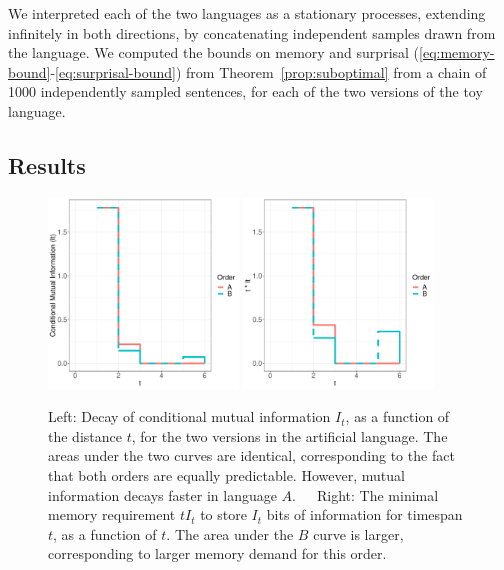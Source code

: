 
We interpreted each of the two languages as a stationary processes, extending infinitely in both directions, by concatenating independent samples drawn from the language.
We computed the bounds on memory and surprisal (\ref{eq:memory-bound}-\ref{eq:surprisal-bound}) from Theorem~\ref{prop:suboptimal} from a chain of 1000 independently sampled sentences, for each of the two versions of the toy language.

\subsection{Results}	

\begin{figure}
\centering
\includegraphics[width=0.45\textwidth]{figures/toy-mis.pdf}
\includegraphics[width=0.45\textwidth]{figures/toy-t-mis.pdf}
%
	\caption{Left: Decay of conditional mutual information $I_t$, as a function of the distance $t$, for the two versions in the artificial language. The areas under the two curves are identical, corresponding to the fact that both orders are equally predictable. However, mutual information decays faster in language $A$.\ \ \ Right: The minimal memory requirement $t I_t$ to store $I_t$ bits of information for timespan $t$, as a function of $t$. The area under the $B$ curve is larger, corresponding to larger memory demand for this order.}\label{fig:toy-mis}
\end{figure}

